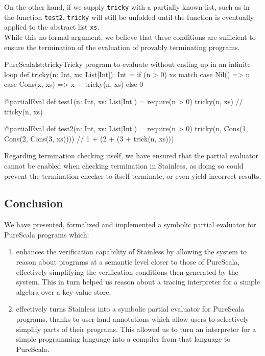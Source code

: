 \documentclass[a4paper,twoside]{article}
\newcommand{\stt}[1]{\texttt{\small{#1}}}
\begin{document}
On the other hand, if we supply \stt{tricky} with a partially known list, such as in the function \stt{test2}, \stt{tricky} will still be unfolded until the function is eventually applied to the abstract list \stt{xs}.\\

While this no formal argument, we believe that these conditions are sufficient to ensure the termination of the evaluation of provably terminating programs.

\begin{Code}{PureScala}{lst:tricky}{Tricky program to evaluate without ending up in an infinite loop}
def tricky(n: Int, xs: List[Int]): Int = {
  if (n > 0) {
    xs match {
      case Nil()       => n
      case Cons(x, xs) => x + tricky(n, xs)
    }
  } else {
    0
  }
}

@partialEval
def test1(n: Int, xs: List[Int]) = {
  require(n > 0)
  tricky(n, xs) // tricky(n, xs)
}

@partialEval
def test2(n: Int, xs: List[Int]) = {
  require(n > 0)
  tricky(n, Cons(1, Cons(2, Cons(3, xs)))) // 1 + (2 + (3 + trick(n, xs)))
}
\end{Code}

Regarding termination checking itself, we have ensured that the partial evaluator cannot be enabled when checking termination in Stainless, as doing so could prevent the termination checker to itself terminate, or even yield incorrect results.

\subsection{Conclusion}

We have presented, formalized and implemented a symbolic partial evaluator for PureScala programs which:

\begin{enumerate}
\item enhances the verification capability of Stainless by allowing the system to reason about programs at a semantic level closer to those of PureScala, effectively simplifying the verification conditions then generated by the system. This in turn helped us reason about a tracing interpreter for a simple algebra over a key-value store.
\item effectively turns Stainless into a symbolic partial evaluator for PureScala programs, thanks to user-land annotations which allow users to selectively simplify parts of their programs. This allowed us to turn an interpreter for a simple programming language into a compiler from that language to PureScala.
\end{enumerate}
\end{document}

